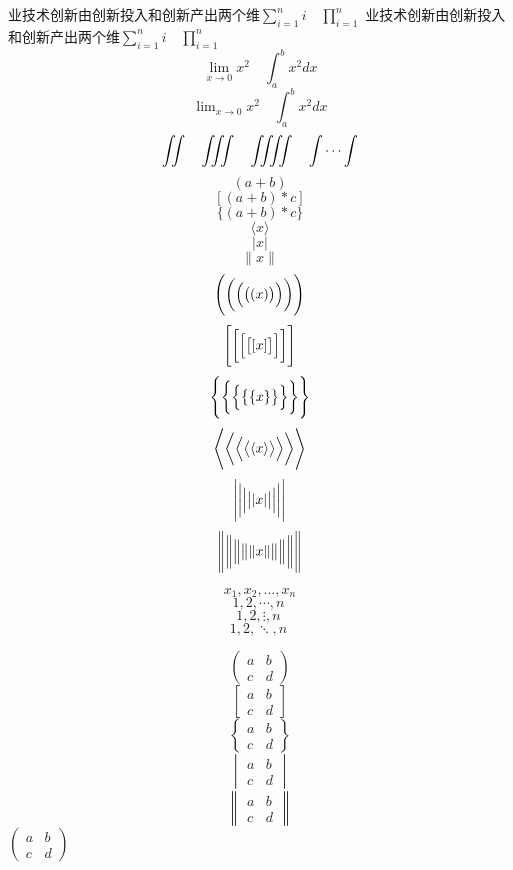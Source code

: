 \documentclass[UTF8]{ctexart} %
\begin{document}
业技术创新由创新投入和创新产出两个维$ \sum_{i=1}^n i \quad  \prod_{i=1}^n $  %
业技术创新由创新投入和创新产出两个维$ \sum\limits _{i=1}^n i\quad \prod\limits _{i=1}^n $  %
\[ \lim_{x\to0}x^2 \quad \int_a^b x^2 dx \] %
\[ \lim\nolimits _{x\to0}x^2 \quad \int\nolimits_a^b x^2 dx \] %
\[ \iint\quad \iiint\quad \iiiint\quad \idotsint \] %
\[ (a+b) \]
\[ [(a+b)*c] \]
\[ \{(a+b)*c\} \] %
\[ \langle x \rangle \] %
\[ \lvert x \rvert \]  %
\[ \lVert x \rVert \] %
\[ \Biggl(\biggl(\Bigl(\bigl((x)\bigr)\Bigr)\biggr)\Biggr) \]
\[ \Biggl[\biggl[\Bigl[\bigl[[x]\bigr]\Bigr]\biggr]\Biggr] \]
\[ \Biggl \{\biggl \{\Bigl\{\bigl\{\{x\}\bigr\}\Bigr\}\biggr\}\Biggr\} \]
\[ \Biggl\langle \biggl\langle \Bigl\langle\bigl\langle\langle x \rangle \bigr\rangle \Bigr\rangle \biggr\rangle \Biggr\rangle \]
\[ \Biggl\lvert \biggl\lvert \Bigl\lvert\bigl\lvert\lvert x \rvert \bigr\rvert \Bigr\rvert \biggr\rvert \Biggr\rvert \]
\[ \Biggl\lVert \biggl\lVert \Bigl\lVert\bigl\lVert\lVert x \rVert \bigr\rVert \Bigr\rVert \biggr\rVert \Biggr\rVert \] %

\[ x_1,x_2,\dots,x_n\] %
\[1,2,\cdots,n\ \] %
\[1,2,\vdots,n\ \] %
\[1,2,\ddots,n\ \] %

\[ \begin{pmatrix} a&b\\c&d \end{pmatrix} \] %
\[ \begin{bmatrix} a&b\\c&d \end{bmatrix} \] %
\[ \begin{Bmatrix} a&b\\c&d \end{Bmatrix} \] %
\[ \begin{vmatrix} a&b\\c&d \end{vmatrix} \] %
\[ \begin{Vmatrix} a&b\\c&d \end{Vmatrix} \] %
$( \begin{smallmatrix} a&b\\c&d \end{smallmatrix} )$ %
\end{document}
